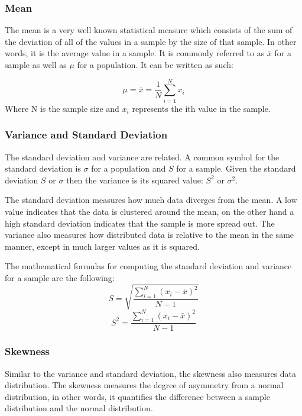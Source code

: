 \subsubsection{Mean}

The mean is a very well known statistical measure which consists of the sum of the deviation of all of the values in a sample by the size of that sample. In other words, it is the average value in a sample. It is commonly referred to as $\bar{x}$ for a sample as well as $\mu$ for a population. It can be written as such:

\begin{equation}
    \mu = \bar{x} = \frac{1}{N}\sum^{N}_{i=1} x_{i}
\end{equation}
Where N is the sample size and $x_{i}$ represents the ith value in the sample.

\subsubsection{Variance and Standard Deviation}

The standard deviation and variance are related. A common symbol for the standard deviation is $\sigma$ for a population and $S$ for a sample. Given the standard deviation $S$ or $\sigma$ then the variance is its squared value: $S^{2}$ or $\sigma^{2}$.

The standard deviation measures how much data diverges from the mean. A low value indicates that the data is clustered around the mean, on the other hand a high standard deviation indicates that the sample is more spread out. The variance also measures how distributed data is relative to the mean in the same manner, except in much larger values as it is squared.

The mathematical formulas for computing the standard deviation and variance for a sample are the following:
\begin{equation}
    S = \sqrt{\frac{\sum_{i=1}^{N}(x_{i} - \bar{x})^{2}}{N - 1}}
\end{equation}
\begin{equation}
    S^2 = \frac{\sum_{i=1}^{N}(x_{i} - \bar{x})^{2}}{N - 1}
\end{equation}

\subsubsection{Skewness}

Similar to the variance and standard deviation, the skewness also measures data distribution. The skewness measures the degree of asymmetry from a normal distribution, in other words, it quantifies the difference between a sample distribution and the normal distribution.

